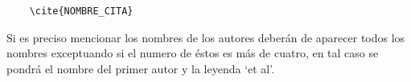 \documentclass[journal,onecolumn]{IEEEtran}
\begin{document}
\begin{verbatim}
    \cite{NOMBRE_CITA}
\end{verbatim}

Si es preciso mencionar los nombres de los autores deberán de aparecer todos los nombres exceptuando si el numero de éstos es más de cuatro, en tal caso se pondrá el nombre del primer autor y la leyenda ‘et al’.




%
%
%
\nocite{*}
\renewcommand{\refname}{Bibliografia}



% 


\end{document}
